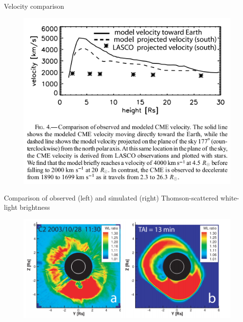 \documentclass{beamer}
\begin{document}
\begin{frame}{Velocity comparison}
\begin{figure}[H]
 \centering
 \includegraphics[scale=0.55]{velComp.png}
\end{figure}

\end{frame}

\begin{frame}{Comparison of observed (left) and simulated (right) Thomson-scattered white-light brightness}
\begin{figure}[H]
 \centering
 \includegraphics[scale=0.4]{wltime1.png}
\end{figure}

\end{frame}

\end{document}
